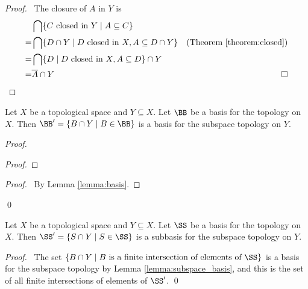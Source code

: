\begin{proof}
    \pf\ The closure of $A$ in $Y$ is
    \begin{align*}
        & \bigcap \{ C \text{ closed in } Y \mid A \subseteq C \} \\
        = & \bigcap \{ D \cap Y \mid D \text{ closed in } X, A \subseteq D \cap Y \} 
            & (\text{Theorem \ref{theorem:closed}})\\
        = & \bigcap \{ D \mid D \text{ closed in } X, A \subseteq D \} \cap Y \\
        = & \overline{A} \cap Y & \qed
    \end{align*}
\end{proof}

\begin{lemma}
    \label{lemma:subspace_basis}
    Let $X$ be a topological space and $Y \subseteq X$. Let $\BB$ be a basis for the topology on $X$.
    Then $\BB' = \{ B \cap Y \mid B \in \BB \}$ is a basis for the subspace topology on $Y$.
\end{lemma}

\begin{proof}
    \pf
    \begin{proof}
    \end{proof}
    \qedstep
    \begin{proof}
        \pf\ By Lemma \ref{lemma:basis}.
    \end{proof}
    \qed
\end{proof}

\begin{lemma}
    \label{lemma:subspace_subbasis}
    Let $X$ be a topological space and $Y \subseteq X$. Let $\SS$ be a basis for the topology on $X$.
    Then $\SS' = \{ S \cap Y \mid S \in \SS \}$ is a subbasis for the subspace topology on $Y$.
\end{lemma}

\begin{proof}
    \pf\ The set $\{ B \cap Y \mid B \text{ is a finite intersection of elements of } \SS \}$ is a basis
    for the subspace topology by Lemma \ref{lemma:subspace_basis}, and this is the set of all finite
    intersections of elements of $\SS'$. \qed
\end{proof}

